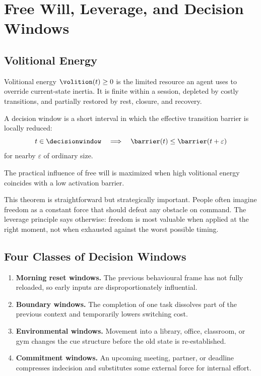 \section{Free Will, Leverage, and Decision Windows}
\label{sec:windows}

\subsection{Volitional Energy}

\begin{definition}
Volitional energy $\volition(t) \geq 0$ is the limited resource an agent uses
to override current-state inertia. It is finite within a session, depleted by
costly transitions, and partially restored by rest, closure, and recovery.
\end{definition}

\begin{definition}
A decision window is a short interval in which the effective transition
barrier is locally reduced:
\[
t \in \decisionwindow \quad \Longrightarrow \quad
\barrier(t) \leq \barrier(t + \varepsilon)
\]
for nearby $\varepsilon$ of ordinary size.
\end{definition}

\begin{theorem}
The practical influence of free will is maximized when high volitional energy
coincides with a low activation barrier.
\end{theorem}

\begin{discussion}
This theorem is straightforward but strategically important. People often
imagine freedom as a constant force that should defeat any obstacle on command.
The leverage principle says otherwise: freedom is most valuable when applied at
the right moment, not when exhausted against the worst possible timing.
\end{discussion}

\subsection{Four Classes of Decision Windows}

\begin{enumerate}
  \item \textbf{Morning reset windows.} The previous behavioural frame has not
        fully reloaded, so early inputs are disproportionately influential.
  \item \textbf{Boundary windows.} The completion of one task dissolves part of
        the previous context and temporarily lowers switching cost.
  \item \textbf{Environmental windows.} Movement into a library, office,
        classroom, or gym changes the cue structure before the old state is
        re-established.
  \item \textbf{Commitment windows.} An upcoming meeting, partner, or deadline
        compresses indecision and substitutes some external force for internal
        effort.
\end{enumerate}

